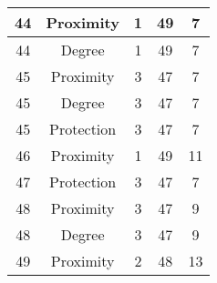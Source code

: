 \documentclass[results.tex]{subfiles}
\begin{document}
\begin{center}
\begin{tabular}{| c || c | c | c | c |}
            \hline
            44                      & Proximity                    & 1                      & 49                      & 7                    \\
            \hline
            44                      & Degree                       & 1                      & 49                      & 7                    \\
            \hline
            45                      & Proximity                    & 3                      & 47                      & 7                    \\
            \hline
            45                      & Degree                       & 3                      & 47                      & 7                    \\
            \hline
            45                      & Protection                   & 3                      & 47                      & 7                    \\
            \hline
            46                      & Proximity                    & 1                      & 49                      & 11                   \\
            \hline
            47                      & Protection                   & 3                      & 47                      & 7                    \\
            \hline
            48                      & Proximity                    & 3                      & 47                      & 9                    \\
            \hline
            48                      & Degree                       & 3                      & 47                      & 9                    \\
            \hline
            49                      & Proximity                    & 2                      & 48                      & 13                   \\
            \hline
        \end{tabular}
    \end{center}
\end{document}
